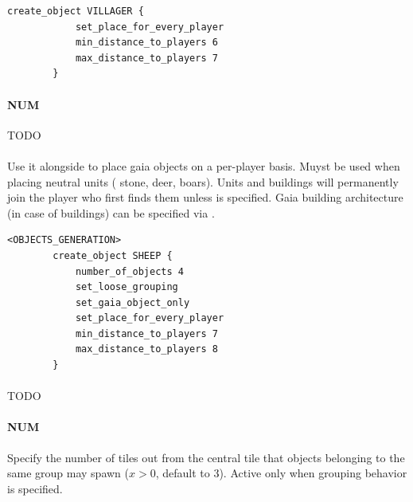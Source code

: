 \begin{appendices}
    \begin{lstlisting}[language={rms}, label={lst:setplaceforeveryplayer}, caption={Example showing how you can give to each player a single villager.}]
        create_object VILLAGER {
            set_place_for_every_player
            min_distance_to_players 6
            max_distance_to_players 7
        }
    \end{lstlisting}

    \paragraph{ NUM}

    TODO

    \paragraph{}

    Use it alongside  to place gaia objects on a per-player basis. Muyst be used when placing neutral units (\eg{} stone, deer, boars). Units and buildings will permanently join the player who first finds them unless  is specified. Gaia building architecture (in case of buildings) can be specified via .

    \begin{lstlisting}[language={rms}, caption={Give every player 4 gaia sheep close to their starting town.}]
        <OBJECTS_GENERATION>
        create_object SHEEP {
            number_of_objects 4
            set_loose_grouping
            set_gaia_object_only
            set_place_for_every_player
            min_distance_to_players 7
            max_distance_to_players 8
        }
    \end{lstlisting}

    \paragraph{}

    TODO

    \paragraph{ NUM}

    Specify the number of tiles out from the central tile that objects belonging to the same group may spawn ($x > 0$, default to 3). Active only  when grouping behavior is specified. 


\end{appendices}
